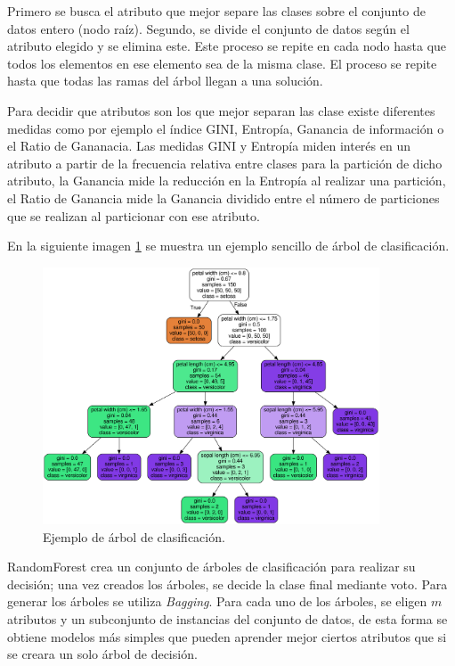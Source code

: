 Primero se busca el atributo que mejor separe las clases sobre el conjunto de datos entero (nodo raíz). Segundo, se divide el conjunto de datos según el atributo elegido y se elimina este. Este proceso se repite en cada nodo hasta que todos los elementos en ese elemento sea de la misma clase. El proceso se repite hasta que todas las ramas del árbol llegan a una solución.\newline

Para decidir que atributos son los que mejor separan las clase existe diferentes medidas como por ejemplo el índice GINI, Entropía, Ganancia de información o el Ratio de Gananacia. Las medidas GINI y Entropía miden interés en un atributo a partir de la frecuencia relativa entre clases para la partición de dicho atributo, la Ganancia mide la reducción en la Entropía al realizar una partición, el Ratio de Ganancia mide la Ganancia dividido entre el número de particiones que se realizan al particionar con ese atributo. \newline

En la siguiente imagen \ref{fig:216} se muestra un ejemplo sencillo de árbol de clasificación.

\begin{figure}[H]
	\centering
	\includegraphics[width=100mm]{imagenes/tree_example.png}
	\caption{Ejemplo de árbol de clasificación.}
	\label{fig:216}
\end{figure}
\verticalspace

RandomForest crea un conjunto de árboles de clasificación para realizar su decisión; una vez creados los árboles, se decide la clase final mediante voto. Para generar los árboles se utiliza \textit{Bagging}. Para cada uno de los árboles, se eligen $m$ atributos y un subconjunto de instancias del conjunto de datos, de esta forma se obtiene modelos más simples que pueden aprender mejor ciertos atributos que si se creara un solo árbol de decisión.\newline

